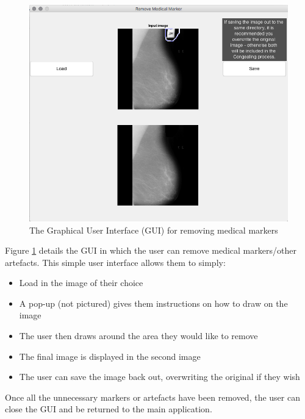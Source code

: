 \begin{figure}[H]
  \center
  \includegraphics[scale=0.5]{Chapter2/software-img/removeMarker.png}
  \caption{The Graphical User Interface (GUI) for removing medical markers}
  \label{fig:medical_gui}
\end{figure}

Figure \ref{fig:medical_gui} details the \acrshort{GUI} in which the user can remove medical markers/other artefacts. This simple user interface allows them to simply:
\begin{itemize}
  \item Load in the image of their choice
  \item A pop-up (not pictured) gives them instructions on how to draw on the image
  \item The user then draws around the area they would like to remove
  \item The final image is displayed in the second image
  \item The user can save the image back out, overwriting the original if they wish
\end{itemize}

Once all the unnecessary markers or artefacts have been removed, the user can close the \acrshort{GUI} and be returned to the main application.
